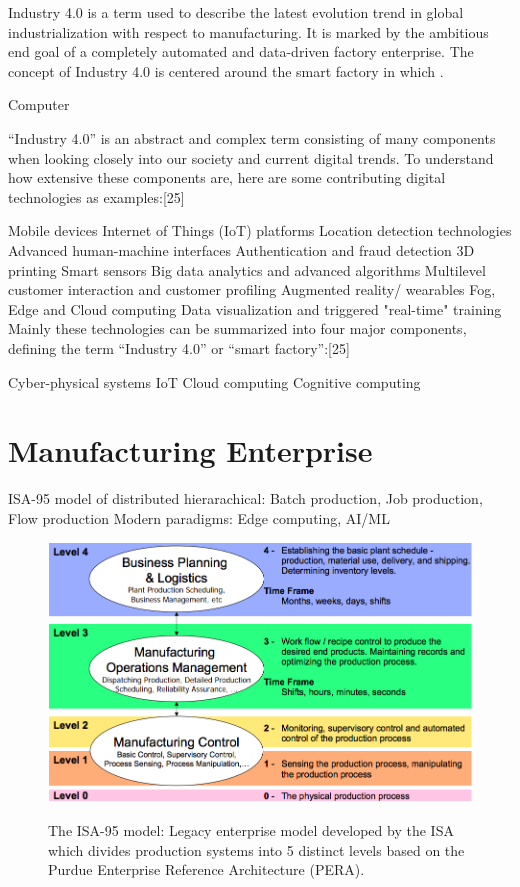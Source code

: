 \documentclass[english]{spimubphdthesis}
\begin{document}
Industry 4.0 is a term used to describe the latest evolution trend in global industrialization with respect to manufacturing.  It is marked by the ambitious end goal of a completely automated and data-driven factory enterprise.  The concept of Industry 4.0 is centered around the smart factory in which . 

Computer

“Industry 4.0” is an abstract and complex term consisting of many components when looking closely into our society and current digital trends. To understand how extensive these components are, here are some contributing digital technologies as examples:[25]

Mobile devices
Internet of Things (IoT) platforms
Location detection technologies
Advanced human-machine interfaces
Authentication and fraud detection
3D printing
Smart sensors
Big data analytics and advanced algorithms
Multilevel customer interaction and customer profiling
Augmented reality/ wearables
Fog, Edge and Cloud computing
Data visualization and triggered "real-time" training
Mainly these technologies can be summarized into four major components, defining the term “Industry 4.0” or “smart factory”:[25]

Cyber-physical systems
IoT
Cloud computing
Cognitive computing

\section{Manufacturing Enterprise}
ISA-95 model of distributed hierarachical: Batch production, Job production, Flow production
Modern paradigms: Edge computing, AI/ML

\begin{figure}[!tbp]
	\begin{center}
		\includegraphics[width=\textwidth]{images/intro/isa95-2.png}
		\label{fig:intro:isa95}
		\caption{The ISA-95 model: Legacy enterprise model developed by the ISA which divides production systems into 5 distinct levels based on the Purdue Enterprise Reference Architecture (PERA).}
	\end{center}
\end{figure}
\end{document}
